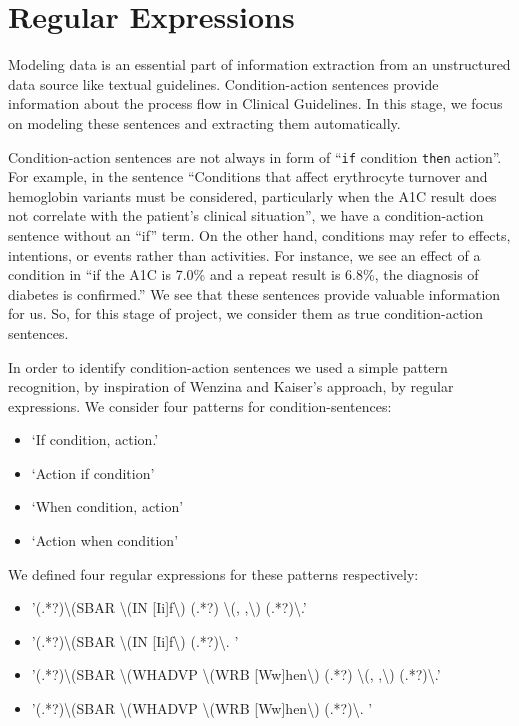 \documentclass[12pt,letterpaper]{article}
\begin{document}
\section{Regular Expressions}
Modeling data is an essential part of information extraction from an unstructured data source like textual guidelines. Condition-action sentences provide information about the process flow in Clinical Guidelines. In this stage, we focus on modeling these sentences and extracting them automatically.

Condition-action sentences are not always in form of ``\texttt{if} condition \texttt{then} action''. For example, in the sentence ``Conditions that affect erythrocyte turnover and hemoglobin variants must be considered, particularly when the A1C result does not correlate with the patient's clinical situation'', we have a condition-action sentence without an ``if'' term. On the other hand, conditions may refer to effects, intentions, or events rather than activities. For instance, we see an effect of a condition in ``if the A1C is 7.0\% and a repeat result is 6.8\%, the diagnosis of diabetes is confirmed.'' We see that these sentences provide valuable information for us. So, for this stage of project, we consider them as true condition-action sentences. 

In order to identify condition-action sentences we used a simple pattern recognition, by inspiration of Wenzina and Kaiser's approach\cite{wenzina2013identifying},  by regular expressions. We consider four patterns for condition-sentences: 
\begin{itemize}
	\item `If condition, action.'
	\item `Action if condition'
	\item `When condition, action'
	\item `Action when condition'
\end{itemize}
We defined four regular expressions for these patterns respectively: 
\begin{itemize}
\item'(.*?)\textbackslash(SBAR \textbackslash(IN [Ii]f\textbackslash) (.*?) \textbackslash(, ,\textbackslash) (.*?)\textbackslash.'
\item'(.*?)\textbackslash(SBAR \textbackslash(IN [Ii]f\textbackslash) (.*?)\textbackslash. '
\item'(.*?)\textbackslash(SBAR \textbackslash(WHADVP \textbackslash(WRB [Ww]hen\textbackslash) (.*?) \textbackslash(, ,\textbackslash) (.*?)\textbackslash.'
\item'(.*?)\textbackslash(SBAR \textbackslash(WHADVP \textbackslash(WRB [Ww]hen\textbackslash) (.*?)\textbackslash. '
\end{itemize}
\end{document}

